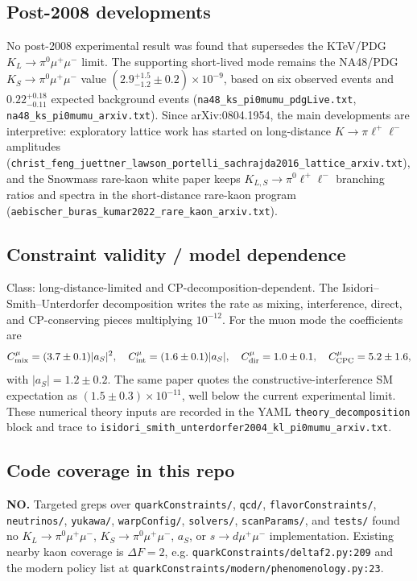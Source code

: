 \subsection*{Post-2008 developments}
No post-2008 experimental result was found that supersedes the KTeV/PDG
\(K_L\to\pi^0\mu^+\mu^-\) limit.  The supporting short-lived mode remains the
NA48/PDG \(K_S\to\pi^0\mu^+\mu^-\) value
\((2.9^{+1.5}_{-1.2}\pm0.2)\times10^{-9}\), based on six observed events and
\(0.22^{+0.18}_{-0.11}\) expected background events
(\texttt{na48\_ks\_pi0mumu\_pdgLive.txt},
\texttt{na48\_ks\_pi0mumu\_arxiv.txt}).  Since arXiv:0804.1954, the main
developments are interpretive: exploratory lattice work has started on
long-distance \(K\to\pi\ell^+\ell^-\) amplitudes
(\texttt{christ\_feng\_juettner\_lawson\_portelli\_sachrajda2016\_lattice\_arxiv.txt}),
and the Snowmass rare-kaon white paper keeps
\(K_{L,S}\to\pi^0\ell^+\ell^-\) branching ratios and spectra in the
short-distance rare-kaon program
(\texttt{aebischer\_buras\_kumar2022\_rare\_kaon\_arxiv.txt}).

\subsection*{Constraint validity / model dependence}
Class: long-distance-limited and CP-decomposition-dependent.  The
Isidori--Smith--Unterdorfer decomposition writes the rate as mixing,
interference, direct, and CP-conserving pieces multiplying \(10^{-12}\).  For
the muon mode the coefficients are
\[
 C_{\rm mix}^{\mu}=(3.7\pm0.1)|a_S|^2,\quad
 C_{\rm int}^{\mu}=(1.6\pm0.1)|a_S|,\quad
 C_{\rm dir}^{\mu}=1.0\pm0.1,\quad
 C_{\rm CPC}^{\mu}=5.2\pm1.6,
\]
with \(|a_S|=1.2\pm0.2\).  The same paper quotes the constructive-interference
SM expectation as \((1.5\pm0.3)\times10^{-11}\), well below the current
experimental limit.  These numerical theory inputs are recorded in the YAML
\texttt{theory\_decomposition} block and trace to
\texttt{isidori\_smith\_unterdorfer2004\_kl\_pi0mumu\_arxiv.txt}.

\subsection*{Code coverage in this repo}
\textbf{NO.}  Targeted greps over \texttt{quarkConstraints/}, \texttt{qcd/},
\texttt{flavorConstraints/}, \texttt{neutrinos/}, \texttt{yukawa/},
\texttt{warpConfig/}, \texttt{solvers/}, \texttt{scanParams/}, and
\texttt{tests/} found no \(K_L\to\pi^0\mu^+\mu^-\), \(K_S\to\pi^0\mu^+\mu^-\),
\(a_S\), or \(s\to d\mu^+\mu^-\) implementation.  Existing nearby kaon coverage
is \(\Delta F=2\), e.g. \texttt{quarkConstraints/deltaf2.py:209} and the modern
policy list at \texttt{quarkConstraints/modern/phenomenology.py:23}.

